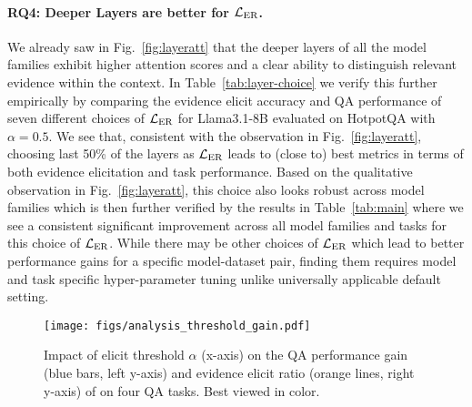 \paragraph{RQ4: Deeper Layers are better for ${\mathcal{L}}_\text{ER}$.}
We already saw in Fig.~\ref{fig:layeratt} that the deeper layers of all the model families exhibit higher attention scores and a clear ability to distinguish relevant evidence within the context.  In Table~\ref{tab:layer-choice} we verify this further empirically by comparing the evidence elicit accuracy and QA performance of seven different choices of ${\mathcal{L}}_\text{ER}$ for Llama3.1-8B evaluated on HotpotQA with $\alpha=0.5$. We see that, consistent with the observation in Fig.~\ref{fig:layeratt}, choosing last 50\% of the layers as ${\mathcal{L}}_\text{ER}$ leads to (close to) best metrics in terms of both evidence elicitation and task performance. Based on the qualitative observation in Fig.~\ref{fig:layeratt}, this choice also looks robust across model families which is then further verified by the results in Table~\ref{tab:main} where we see a consistent significant improvement across all model families and tasks for this choice of ${\mathcal{L}}_\text{ER}$. While there may be other choices of ${\mathcal{L}}_\text{ER}$ which lead to better performance gains for a specific model-dataset pair, finding them requires model and task specific hyper-parameter tuning unlike universally applicable default setting.
\begin{figure*}[t]
    \centering
    \texttt{[image: figs/analysis\_threshold\_gain.pdf]}
    \vspace{-15pt}
    \caption{
        Impact of elicit threshold $\alpha$ (x-axis) on the QA performance gain (blue bars, left y-axis) and evidence elicit ratio (orange lines, right y-axis) of \se on four QA tasks.
        Best viewed in color.
    }
    \label{fig:threshold}
\end{figure*}


